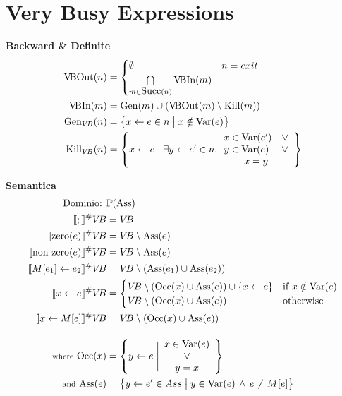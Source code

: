\documentclass[a4paper,12pt,openany]{article}
\newcommand{\VB}{V\!B}
\begin{document}
    \clearpage\section*{Very Busy Expressions}
    \textbf{Backward \& Definite}
    \begin{align*}
    \mbox{\VB Out}(n) &=
    \begin{cases}
    \emptyset & n = exit\\
    \bigcap\limits_{m\in \mbox{Succ}(n)} \mbox{\VB In}(m)
    \end{cases}\\
    \mbox{\VB In}(m) &= \mbox{Gen}(m) \cup (\mbox{\VB Out}(m) \setminus \mbox{Kill}(m))\\
    \mbox{Gen}_{\VB}(n) &= \left\{
    x\leftarrow e \in n\;\big\vert\; x \notin\mbox{Var}(e)
    \right\}\\
    \mbox{Kill}_{\VB}(n) &= \left\{
        x\leftarrow e \;\Big\vert\; \exists y\leftarrow e'\in n.\,
        \begin{array}{cc}
            x\in \mbox{Var}(e')\quad\lor\\
            y\in \mbox{Var}(e)\;\quad\lor\\
            x = y
        \end{array}
    \right\}
    \end{align*}
    
    \textbf{Semantica}
    \begin{align*}
    \mbox{Dominio: }& \mathbb{P}(\mbox{Ass})\\
    \llbracket ; \rrbracket^\#\VB &= \VB\\
    \llbracket \mbox{zero}(e) \rrbracket^\#\VB &= \VB \setminus \mbox{Ass}(e)\\
    \llbracket \mbox{non-zero}(e) \rrbracket^\#\VB &= \VB \setminus \mbox{Ass}(e)\\
    \llbracket M[e_1]\leftarrow e_2 \rrbracket^\#\VB &= \VB \setminus (\mbox{Ass}(e_1) \cup \mbox{Ass}(e_2))\\
    \llbracket x \leftarrow e \rrbracket^\#\VB &= 
    \begin{cases}
    \VB \setminus (\mbox{Occ}(x) \cup \mbox{Ass}(e)) \cup \{x\leftarrow e\}& \mbox{if } x \notin \mbox{Var}(e)\\
    \VB \setminus (\mbox{Occ}(x) \cup \mbox{Ass}(e)) & \mbox{otherwise}
    \end{cases}\\
    \llbracket x\leftarrow M[e] \rrbracket^\#\VB &= \VB \setminus (\mbox{Occ}(x) \cup \mbox{Ass}(e))\\[1em]
    \mbox{{\footnotesize where} Occ}(x) &=
    \left\{
        y\leftarrow e \;\Bigg\vert
        \begin{array}{cc}
            x \in \mbox{Var}(e)\\
            \lor\\
            y=x
        \end{array}
    \right\}\\
    \mbox{{\footnotesize and} Ass}(e) &=
    \left\{
    y\leftarrow e' \in Ass \;\big\vert\;
    y \in \mbox{Var}(e) \,\land\, e \neq M[e]
    \right\}\\
    \end{align*}
\end{document}
